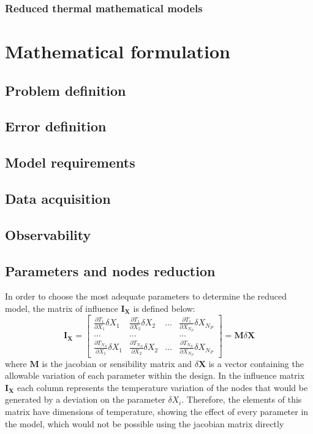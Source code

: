 \begin{itemize}
\subsection{Reduced thermal mathematical models}

\chapter{Mathematical formulation}
\section{Problem definition}
\section{Error definition}
\section{Model requirements}
\section{Data acquisition}
\section{Observability}
\section{Parameters and nodes reduction}
In order to choose the most adequate parameters to determine the reduced model, the matrix of influence $\mathbf{I}_{\mathbf{X}}$ is defined below:
\begin{equation}
\mathbf{I}_{\mathbf{X}}=\left[\begin{array}{cccc}
\frac{\partial T_1}{\partial X_1} \delta X_1 & \frac{\partial T_1}{\partial X_2} \delta X_2 & \ldots & \frac{\partial T_1}{\partial X_{N_P}} \delta X_{N_P} \\
\ldots & \ldots & & \ldots \\
\frac{\partial T_{N_N}}{\partial X_1} \delta X_1 & \frac{\partial T_{N_N}}{\partial X_2} \delta X_2 & \ldots & \frac{\partial T_{N_N}}{\partial X_{N_P}} \delta X_{N_P}
\end{array}\right]=\mathbf{M} \delta \boldsymbol{X}
\end{equation}
where $\mathbf{M}$ is the jacobian or sensibility matrix and $ \delta \boldsymbol{X}$ is a vector containing the allowable variation of each parameter within the design. In the influence matrix $\mathbf{I}_{\mathbf{X}}$ each column represents the temperature variation of the nodes that would be generated by a deviation on the parameter $ \delta X_i$. Therefore, the elements of this matrix have dimensions of temperature, showing the effect of every parameter in the model, which would not be possible using the jacobian matrix directly

\end{itemize}
